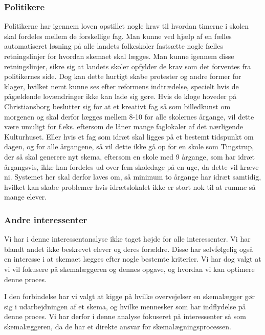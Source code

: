 \subsubsection{Politikere}
Politikerne har igennem loven opstillet nogle krav til hvordan timerne i skolen skal fordeles mellem de forskellige fag. Man kunne ved hjælp af en fælles automatiseret løsning på alle landets folkeskoler fastsætte nogle fælles retningslinjer for hvordan skemaet skal lægges. Man kunne igennem disse retningslinjer, sikre sig at landets skoler opfylder de krav som det forventes fra politikernes side. Dog kan dette hurtigt skabe protester og andre former for klager, hvilket nemt kunne ses efter reformens indtrædelse\cite{LaererBrok}, specielt hvis de pågældende lovændringer ikke kan lade sig gøre. Hvis de kloge hoveder på Christiansborg beslutter sig for at et kreativt fag så som billedkunst om morgenen og skal derfor lægges mellem 8-10 for alle skolernes årgange, vil dette være umuligt for f.eks. \school eftersom de låner mange faglokaler af det nærligende Kulturhuset\cite{interview_Kaerby}. Eller hvis et fag som idræt skal ligges på et bestemt tidspunkt om dagen, og for alle årgangene, så vil dette ikke gå op for en skole som Tingstrup\cite{interview_Tingstrup}, der så skal generere nyt skema, eftersom en skole med 9 årgange, som har idræt årgangsvis, ikke kan fordeles ud over fem skoledage på en uge, da dette vil kræve ni. Systemet her skal derfor laves om, så minimum to årgange har idræt samtidig, hvilket kan skabe problemer hvis idrætslokalet ikke er stort nok til at rumme så mange elever.

\subsubsection{Andre interessenter}
Vi har i denne interessentanalyse ikke taget højde for alle interessenter. Vi har blandt andet ikke beskrevet elever og deres forældre. Disse har selvfølgelig også en interesse i at skemaet lægges efter nogle bestemte kriterier. Vi har dog valgt at vi vil fokusere på skemalæggeren og dennes opgave, og hvordan vi kan optimere denne proces.

I den forbindelse har vi valgt at kigge på hvilke overvejelser en skemalægger gør sig i udarbejdningen af et skema, og hvilke mennesker som har indflydelse på denne proces. Vi har derfor i denne analyse fokuseret på interessenter så som skemalæggeren, da de har et direkte ansvar for skemalægningsprocessen.




